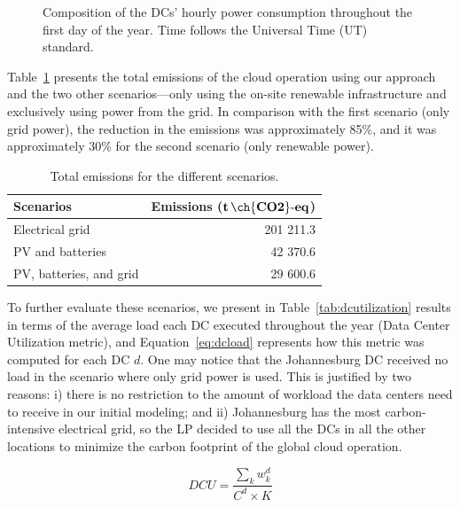  \begin{figure}[h]
  \centering
   {}
  \caption{Composition of the DCs' hourly power consumption throughout the first day of the year. Time follows the Universal Time (UT) standard.}
  \label{fig:power_ratio_hourly}
\end{figure}

Table~\ref{tab:emissions} presents the total  emissions of the cloud operation using our approach and the two other scenarios---only using the on-site renewable infrastructure and exclusively using power from the grid. In comparison with the first scenario (only grid power), the reduction in the  emissions was approximately 85\%, and it was approximately 30\% for the second scenario (only renewable power).


\begin{table}[h]
\caption{Total emissions for the different scenarios.}\label{tab:emissions} \centering
\begin{tabular}{|p{5cm}|r|}
  \hline
  \textbf{Scenarios} & \textbf{Emissions ($\mathbf{t\,\ch{CO2}\text{-}eq}$)}   \\
  \hline
  Electrical grid                    & 201 211.3    \\
  \hline
  PV and batteries  &                  42 370.6 \\ 
  \hline
  PV, batteries, and grid            &  29 600.6   \\
  \hline


\end{tabular}
\end{table}

To further evaluate these scenarios, we present in Table~\ref{tab:dcutilization} results in terms of the average load each DC executed throughout the year (Data Center Utilization metric), and Equation~\eqref{eq:dcload} represents how this metric was computed for each DC $d$. One may notice that the Johannesburg DC received no load in the scenario where only grid power is used. This is justified by two reasons: i) there is no restriction to the amount of workload the data centers need to receive in our initial modeling; and ii) Johannesburg has the most carbon-intensive electrical grid, so the LP decided to use all the DCs in all the other locations to minimize the carbon footprint of the global cloud operation.

\begin{equation}\label{eq:dcload}
DCU = \frac{\sum_k w^d_k} {C^d \times K }
\end{equation}


